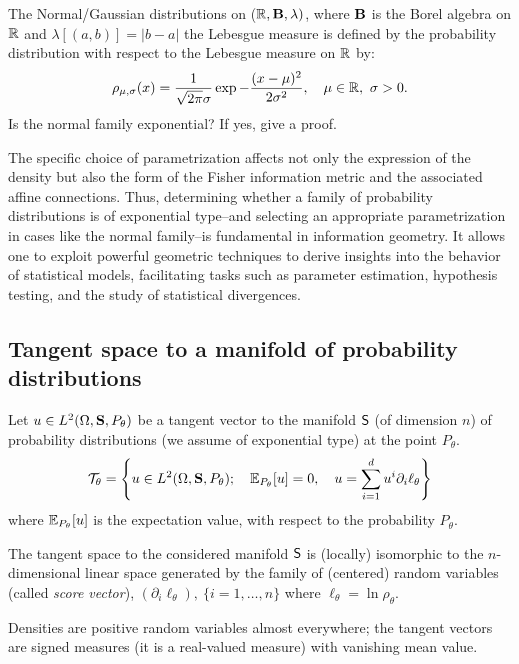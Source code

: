 {\begin{ex}\label{Ex:Gauss}
The Normal/Gaussian distributions on ($\mathbb{R}, \mathbf{B},\lambda)$, where $\mathbf{B}$ is the Borel algebra on $\mathbb{R}$ and $\lambda[(a,b)]=\vert b-a\vert$ the Lebesgue measure is defined by  the probability distribution with respect to the Lebesgue measure on $\mathbb{R}$ by: 
\[\rho_{\mu,\sigma}(x)=\frac{1}{\sqrt{2\pi}\sigma}\exp{-\frac{(x-\mu)^2}{2\sigma^2}}, \quad \mu\in \mathbb{R},\ \sigma >0.\]
Is the normal family exponential? If yes, give a proof. 
\end{ex}


The specific choice of parametrization affects not only the expression of the density but also the form of the Fisher information metric and the associated affine connections. 
Thus, determining whether a family of probability distributions is of exponential type--and selecting an appropriate parametrization in cases like the normal family--is fundamental in information geometry. It allows one to exploit powerful geometric techniques to derive insights into the behavior of statistical models, facilitating tasks such as parameter estimation, hypothesis testing, and the study of statistical divergences.

\subsection{Tangent space to a manifold of probability distributions}
Let $u\in L^{2}(\Omega,\mathbf{S}, P_{\theta})$ be a tangent vector to the manifold  $\mathsf{S}$ (of dimension $n$) of
probability distributions (we assume of exponential type) at the point $P_{\theta}$.
\[
\mathcal{T}_{\theta}=\left\{ u\in L^{2}(\Omega, \mathbf{S}, P_{\theta}); \quad \mathbb{E}_{P_{\theta}}[u]=0,\quad u=\sum_{i=1}^{d}u^i\partial_{i}\ell_{\theta}         \right\}
\]
where $\mathbb{E}_{P_{\theta}}[u]$  is the expectation value, with respect to the probability ${P_{\theta}}$.

The tangent space to the considered manifold $\mathsf{S}$ is (locally) isomorphic to the $n$-dimensional linear space generated by the family of (centered) random variables (called \emph{score vector}),
$( \partial_{i}\ell_\theta), \ \{i=1,\dots,n\}$ where $\ell_{\theta} = \ln \rho_{\theta}.$

\begin{remark}
Densities are positive random variables almost everywhere; the tangent vectors are signed measures (it is a real-valued measure) with vanishing mean value.  
\end{remark} 

}
